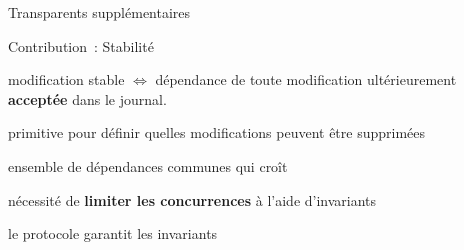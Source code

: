 \begin{frame}
    Transparents supplémentaires
\end{frame}


\begin{frame}{Contribution~: Stabilité}
    \begin{minipage}{\textwidth}
        \begin{definition}
            modification stable $\iff$ dépendance de toute modification ultérieurement \textbf{acceptée} dans le journal.
        \end{definition}
        \vspace{1em}
        \begin{compactitemize}
            \item primitive pour définir quelles modifications peuvent être supprimées
            \item ensemble de dépendances communes qui croît
            \begin{compactitemize}
                \item nécessité de \textbf{limiter les concurrences} à l'aide d'invariants
                \item le protocole garantit les invariants
            \end{compactitemize}
        \end{compactitemize}
    \end{minipage}
\end{frame}



